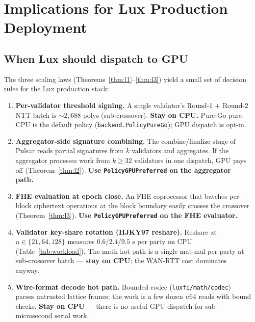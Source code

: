 \section{Implications for Lux Production Deployment}
\label{sec:implications}

\subsection{When Lux should dispatch to GPU}

The three scaling laws (Theorems~\ref{thm:l1}--\ref{thm:l3}) yield
a small set of decision rules for the Lux production stack:

\begin{enumerate}[leftmargin=2em,nosep]
\item \textbf{Per-validator threshold signing.} A single validator's
Round-1 + Round-2 NTT batch is $\sim 2{,}688$ polys (sub-crossover).
\textbf{Stay on CPU.} Pure-Go pure-CPU is the default policy
(\texttt{backend.PolicyPureGo}); GPU dispatch is opt-in.

\item \textbf{Aggregator-side signature combining.} The
combine/finalize stage of Pulsar reads partial signatures from $k$
validators and aggregates. If the aggregator processes work from
$k \geq 32$ validators in one dispatch, GPU pays off
(Theorem~\ref{thm:l2}). \textbf{Use \texttt{PolicyGPUPreferred} on the
aggregator path.}

\item \textbf{FHE evaluation at epoch close.} An FHE coprocessor that
batches per-block ciphertext operations at the block boundary easily
crosses the crossover (Theorem~\ref{thm:l3}).
\textbf{Use \texttt{PolicyGPUPreferred} on the FHE evaluator.}

\item \textbf{Validator key-share rotation (HJKY97 reshare).} Reshare
at $n \in \{21, 64, 128\}$ measures $0.6$/$2.4$/$9.5$ s per party
on CPU (Table~\ref{tab:workload}). The math hot path is a single
mat-mul per party at sub-crossover batch — \textbf{stay on CPU}; the
WAN-RTT cost dominates anyway.

\item \textbf{Wire-format decode hot path.} Bounded codec
(\texttt{luxfi/math/codec}) parses untrusted lattice frames; the
work is a few dozen $u64$ reads with bound checks.
\textbf{Stay on CPU} — there is no useful GPU dispatch for
sub-microsecond serial work.
\end{enumerate}

